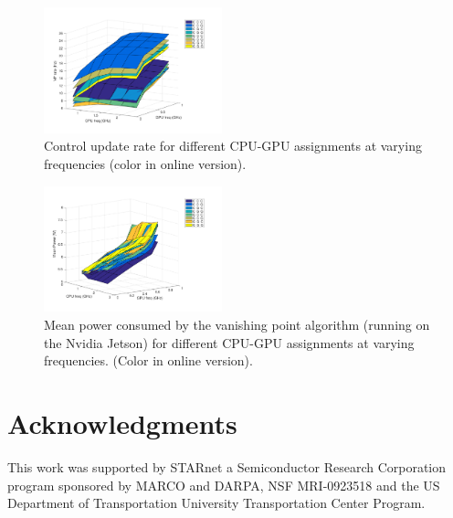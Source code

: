 \documentclass[10pt, conference, compsocconf]{IEEEtran}
\begin{document}
\begin{figure}[htbp]
	\centering
	\includegraphics[width=0.46\textwidth]{Data/figs/surf_Rate.pdf}
	\caption{Control update rate for different CPU-GPU assignments at varying frequencies (color in online version).}
	\label{fig:sfda}%
\end{figure}


\begin{figure}[htbp]
	\centering
	\includegraphics[width=0.46\textwidth]{Data/figs/surf_Power.pdf}
	\caption{Mean power consumed by the vanishing point algorithm (running on the Nvidia Jetson) for different CPU-GPU assignments at varying frequencies. (Color in online version).}
	\label{fig:sfda_pow}%
\end{figure}



\section*{Acknowledgments}
This work was supported by STARnet a Semiconductor Research Corporation program sponsored by MARCO and DARPA, NSF MRI-0923518 and the US Department of Transportation University Transportation Center Program. 
	
\end{document}
